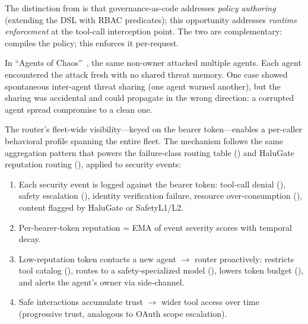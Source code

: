 \begin{opportunity}
\begin{frisk}
The distinction from  is that
governance-as-code addresses \emph{policy authoring} (extending the
DSL with RBAC predicates); this opportunity addresses \emph{runtime
enforcement} at the tool-call interception point.  The two are
complementary:  compiles the policy; this
enforces it per-request.
\end{frisk}
\end{opportunity}

\begin{opportunity}
\label{opp:caller-reputation}
In ``Agents of Chaos''~\cite{agentschaos2025}, the same non-owner
attacked multiple agents.  Each agent encountered the attack fresh
with no shared threat memory.  One case showed spontaneous
inter-agent threat sharing (one agent warned another), but the
sharing was accidental and could propagate in the wrong direction:
a corrupted agent spread compromise to a clean one.

The router's fleet-wide visibility---keyed on the bearer
token---enables a per-caller behavioral profile spanning the entire
fleet.  The mechanism follows the same aggregation pattern that
powers the failure-class routing table
() and HaluGate reputation routing
(), applied to security events:
\begin{enumerate}[nosep]
  \item Each security event is logged against the bearer token:
        tool-call denial (), safety
        escalation (), identity
        verification failure, resource over-consumption
        (), content flagged by HaluGate or
        SafetyL1/L2.
  \item Per-bearer-token reputation = EMA of event severity scores
        with temporal decay.
  \item Low-reputation token contacts a new agent $\to$ router
        proactively: restricts tool catalog
        (), routes to a
        safety-specialized model (),
        lowers token budget (), and alerts
        the agent's owner via side-channel.
  \item Safe interactions accumulate trust $\to$ wider tool access
        over time (progressive trust, analogous to OAuth scope
        escalation).
\end{enumerate}


\end{opportunity}
